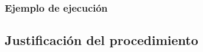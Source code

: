 

\subsubsection{Ejemplo de ejecuci\'on} \label{ej_2:ejemplo}

\subsection{Justificaci\'on del procedimiento} \label{ej_2:justificacion}


%
%
%
%
%
